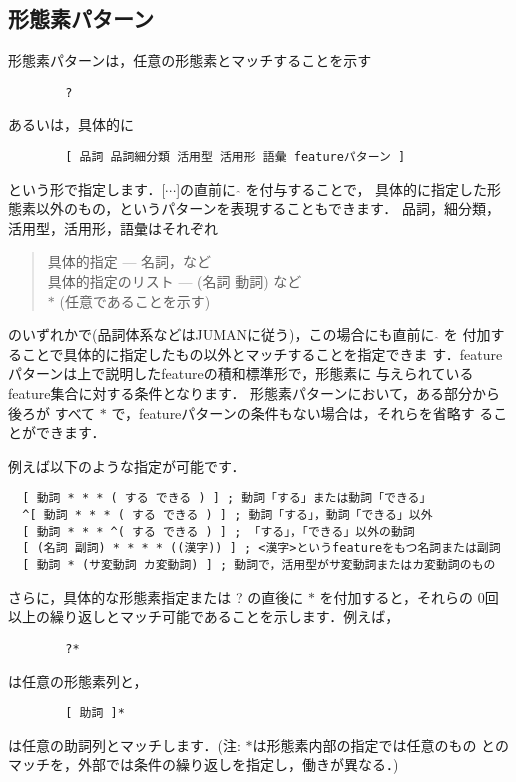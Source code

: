 \documentclass[a4j,11pt,titlepage]{jarticle}
\begin{document}
\subsection{形態素パターン}
\vspace{5mm}

形態素パターンは，任意の形態素とマッチすることを示す
\begin{verbatim}
        ?
\end{verbatim}
あるいは，具体的に
\begin{verbatim}
        [ 品詞 品詞細分類 活用型 活用形 語彙 featureパターン ]
\end{verbatim}
という形で指定します．[$\cdots$]の直前に $\hat{ }$ を付与することで，
具体的に指定した形態素以外のもの，というパターンを表現することもできます．
品詞，細分類，活用型，活用形，語彙はそれぞれ
\begin{quote}
  具体的指定 --- 名詞，など \\
  具体的指定のリスト --- (名詞 動詞) など \\
  $*$ (任意であることを示す)
\end{quote}
のいずれかで(品詞体系などはJUMANに従う)，この場合にも直前に $\hat{ }$ を
付加することで具体的に指定したもの以外とマッチすることを指定できま
す．featureパターンは上で説明したfeatureの積和標準形で，形態素に
与えられているfeature集合に対する条件となります．
形態素パターンにおいて，ある部分から後ろが
すべて $*$ で，featureパターンの条件もない場合は，それらを省略す
ることができます．

例えば以下のような指定が可能です．
\begin{verbatim}
  [ 動詞 * * * ( する できる ) ] ; 動詞「する」または動詞「できる」
  ^[ 動詞 * * * ( する できる ) ] ; 動詞「する」，動詞「できる」以外 
  [ 動詞 * * * ^( する できる ) ] ; 「する」，「できる」以外の動詞
  [ (名詞 副詞) * * * * ((漢字)) ] ; <漢字>というfeatureをもつ名詞または副詞
  [ 動詞 * (サ変動詞 カ変動詞) ] ; 動詞で，活用型がサ変動詞またはカ変動詞のもの
\end{verbatim}

さらに，具体的な形態素指定または ? の直後に $*$ を付加すると，それらの
0回以上の繰り返しとマッチ可能であることを示します．例えば，
\begin{verbatim}
        ?*
\end{verbatim}
は任意の形態素列と，
\begin{verbatim}
        [ 助詞 ]*  
\end{verbatim}
は任意の助詞列とマッチします．(注: $*$は形態素内部の指定では任意のもの
とのマッチを，外部では条件の繰り返しを指定し，働きが異なる．)
\end{document}

